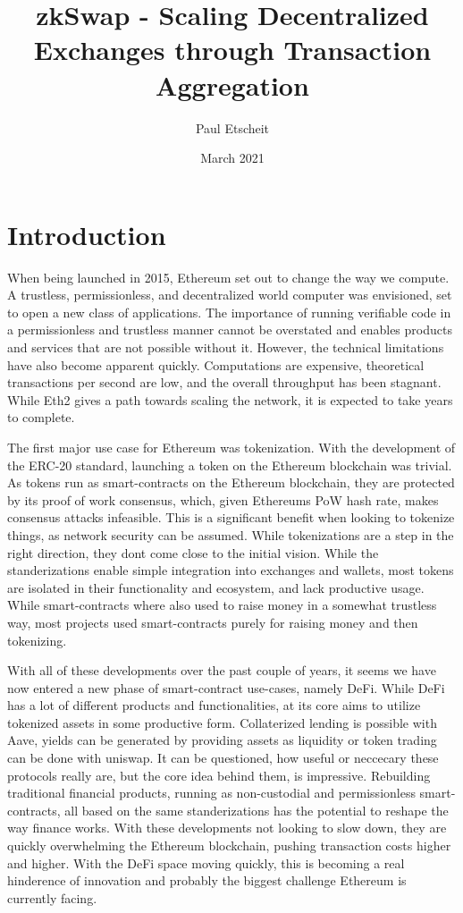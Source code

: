 \documentclass[11pt,twoside,a4paper,final]{book}
\title{zkSwap - Scaling Decentralized Exchanges through Transaction Aggregation}
\author{Paul Etscheit}
\date{March 2021}
\begin{document}
\begin{titlepage}
\maketitle
\end{titlepage}

\section{Introduction}
When being launched in 2015, Ethereum set out to change the way we compute. A trustless, permissionless, and decentralized world computer was envisioned, set to open a new class of applications. The importance of running verifiable code in a permissionless and trustless manner cannot be overstated and enables products and services that are not possible without it. However, the technical limitations have also become apparent quickly. Computations are expensive, theoretical transactions per second are low, and the overall throughput has been stagnant. While Eth2 gives a path towards scaling the network, it is expected to take years to complete. 

The first major use case for Ethereum was tokenization. With the development of the ERC-20 standard, launching a token on the Ethereum blockchain was trivial. As tokens run as smart-contracts on the Ethereum blockchain, they are protected by its proof of work consensus, which, given Ethereums PoW hash rate, makes consensus attacks infeasible. This is a significant benefit when looking to tokenize things, as network security can be assumed. While tokenizations are a step in the right direction, they dont come close to the initial vision. While the standerizations enable simple integration into exchanges and wallets, most tokens are isolated in their functionality and ecosystem, and lack productive usage. While smart-contracts where also used to raise money in a somewhat trustless way, most projects used smart-contracts purely for raising money and then tokenizing. 

With all of these developments over the past couple of years, it seems we have now entered a new phase of smart-contract use-cases, namely DeFi. While DeFi has a lot of different products and functionalities, at its core aims to utilize tokenized assets in some productive form. Collaterized lending is possible with Aave, yields can be generated by providing assets as liquidity or token trading can be done with uniswap. It can be questioned, how useful or neccecary these protocols really are, but the core idea behind them, is impressive. Rebuilding traditional financial products, running as non-custodial and permissionless smart-contracts, all based on the same standerizations has the potential to reshape the way finance works. With these developments not looking to slow down, they are quickly overwhelming the Ethereum blockchain, pushing transaction costs higher and higher. With the DeFi space moving quickly, this is becoming a real hinderence of innovation and probably the biggest challenge Ethereum is currently facing. 
\end{document}
